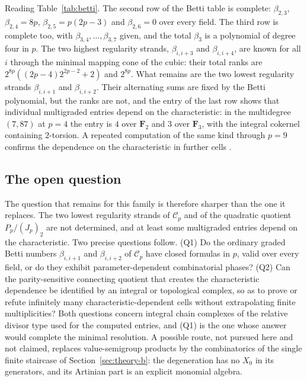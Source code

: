 \documentclass[11pt]{article}
\theoremstyle{definition}
\theoremstyle{remark}
\newcommand{\Cfiber}{\mathcal{C}}
\begin{document}
Reading Table~\ref{tab:betti}. The second row of the Betti table is complete: $\beta_{2,3}$, $\beta_{2,4}=8p$,
$\beta_{2,5}=p(2p-3)$ and $\beta_{2,6}=0$ over every field. The third row is complete too, with
$\beta_{3,4},\ldots,\beta_{3,7}$ given, and the total $\beta_3$ is a polynomial of degree four in $p$. The two
highest regularity strands, $\beta_{i,i+3}$ and $\beta_{i,i+4}$, are known for all $i$ through the minimal
mapping cone of the cubic: their total ranks are $2^{8p}((2p-4)2^{2p-2}+2)$ and $2^{8p}$. What remains
are the two lowest regularity strands $\beta_{i,i+1}$ and $\beta_{i,i+2}$. Their alternating
sums are fixed by the Betti polynomial, but the ranks are not, and the entry of the last row
shows that individual multigraded entries depend on the characteristic: in the multidegree
$(7,87)$ at $p=4$ the entry is $4$ over $\mathbf F_2$ and $3$ over $\mathbf F_3$, with the integral
cokernel containing $2$-torsion. A repeated computation of the same kind through $p=9$ confirms the
dependence on the characteristic in further cells \cite{SantibanezLeal2026}.

\subsection{The open question}

The question that remains for this family is therefore sharper than the one it replaces. The two lowest
regularity strands of $\Cfiber_p$ and of the quadratic quotient $P_p/(J_p)_2$ are not determined, and
at least some multigraded entries depend on the characteristic. Two precise questions follow.
(Q1) Do the ordinary graded Betti numbers $\beta_{i,i+1}$ and $\beta_{i,i+2}$ of $\Cfiber_p$ have
closed formulas in $p$, valid over every field, or do they exhibit parameter-dependent
combinatorial phases? (Q2) Can the parity-sensitive connecting quotient that creates the
characteristic dependence be identified by an integral or topological complex, so as to prove or
refute infinitely many characteristic-dependent cells without extrapolating finite
multiplicities? Both questions concern integral chain complexes of the relative divisor type used
for the computed entries, and (Q1) is the one whose answer would complete the minimal resolution.
A possible route, not pursued here and not claimed, replaces value-semigroup
products by the combinatorics of the single finite staircase of Section~\ref{sec:theory-b}: the
degeneration has no $X_0$ in its generators, and its Artinian part is an explicit monomial
algebra.
\end{document}
